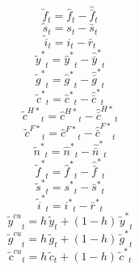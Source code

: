 \begin{dmath}
{{\tilde f}}_{t}={{\hat f}}_{t}-{{\hat {\bar f}}}_{t}
\end{dmath}
\begin{dmath}
{{\tilde s}}_{t}={{s}}_{t}-{{\bar s}}_{t}
\end{dmath}
\begin{dmath}
{{\tilde i}}_{t}={{i}}_{t}-{{\bar r}}_{t}
\end{dmath}
\begin{dmath}
{{\tilde y^*}}_{t}={{\hat y^*}}_{t}-{{\hat {\bar y}^*}}_{t}
\end{dmath}
\begin{dmath}
{{\tilde g^*}}_{t}={{\hat g^*}}_{t}-{{\hat {\bar g}^*}}_{t}
\end{dmath}
\begin{dmath}
{{\tilde c^*}}_{t}={{\hat c^*}}_{t}-{{\hat {\bar c}^*}}_{t}
\end{dmath}
\begin{dmath}
{{\tilde c^{H*}}}_{t}={{\hat c^{H*}}}_{t}-{{\hat {\bar c}^{H*}}}_{t}
\end{dmath}
\begin{dmath}
{{\tilde c^{F*}}}_{t}={{\hat c^{F*}}}_{t}-{{\hat {\bar c}^{F*}}}_{t}
\end{dmath}
\begin{dmath}
{{\tilde n^*}}_{t}={{\hat n^*}}_{t}-{{\hat {\bar n}^*}}_{t}
\end{dmath}
\begin{dmath}
{{\tilde f^*}}_{t}={{\hat f^*}}_{t}-{{\hat {\bar f}^*}}_{t}
\end{dmath}
\begin{dmath}
{{\tilde s^*}}_{t}={{s^*}}_{t}-{{\bar s^*}}_{t}
\end{dmath}
\begin{dmath}
{{\tilde i^*}}_{t}={{i^*}}_{t}-{{\bar r^*}}_{t}
\end{dmath}
\begin{dmath}
{{\tilde y^{cu}}}_{t}={{h}}\, {{\tilde y}}_{t}+\left(1-{{h}}\right)\, {{\tilde y^*}}_{t}
\end{dmath}
\begin{dmath}
{{\tilde g^{cu}}}_{t}={{h}}\, {{\tilde g}}_{t}+\left(1-{{h}}\right)\, {{\tilde g^*}}_{t}
\end{dmath}
\begin{dmath}
{{\tilde c^{cu}}}_{t}={{h}}\, {{\tilde c}}_{t}+\left(1-{{h}}\right)\, {{\tilde c^*}}_{t}
\end{dmath}
